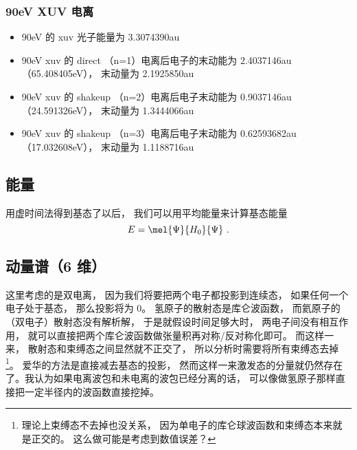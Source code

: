 \subsubsection{90eV XUV 电离}
\begin{itemize}
\item 90eV 的 xuv 光子能量为 3.3074390au

\item 90eV xuv 的 direct （n=1）电离后电子的末动能为 2.4037146au（65.408405eV）， 末动量为 2.1925850au

\item 90eV xuv 的 shakeup （n=2）电离后电子末动能为 0.9037146au （24.591326eV）， 末动量为 1.3444066au

\item 90eV xuv 的 shakeup （n=3）电离后电子末动能为 0.62593682au （17.032608eV）， 末动量为 1.1188716au
\end{itemize}

\subsection{能量}
用虚时间法得到基态了以后， 我们可以用平均能量来计算基态能量
\begin{equation}
E = \mel{\Psi}{H_0}{\Psi}~.
\end{equation}

\subsection{动量谱（6 维）}
这里考虑的是双电离， 因为我们将要把两个电子都投影到连续态， 如果任何一个电子处于基态， 那么投影将为 0。 氢原子的散射态是库仑波函数， 而氦原子的（双电子）散射态没有解析解， 于是就假设时间足够大时， 两电子间没有相互作用， 就可以直接把两个库仑波函数做张量积再对称/反对称化即可。 而这样一来， 散射态和束缚态之间显然就不正交了， 所以分析时需要将所有束缚态去掉\footnote{理论上束缚态不去掉也没关系， 因为单电子的库仑球波函数和束缚态本来就是正交的。 这么做可能是考虑到数值误差？}。 爱华的方法是直接减去基态的投影， 然而这样一来激发态的分量就仍然存在了。我认为如果电离波包和未电离的波包已经分离的话， 可以像做氢原子那样直接把一定半径内的波函数直接挖掉。

